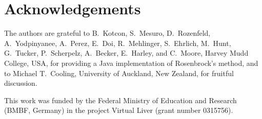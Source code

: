 \documentclass[10pt]{bmc_article}
\newenvironment{bmcformat}{\baselineskip20pt\sloppy\setboolean{publ}{false}}{\baselineskip20pt\sloppy}
\begin{document}
\begin{bmcformat}
    

\section*{Acknowledgements}
The authors are grateful to B.~Kotcon, S.~Mesuro, D.~Rozenfeld, A.~Yodpinyanee,
A.~Perez, E.~Doi, R.~Mehlinger, S.~Ehrlich, M.~Hunt, G.~Tucker, P.~Scherpelz,
A.~Becker, E.~Harley, and C.~Moore, Harvey Mudd College, USA, for providing a
Java implementation of Rosenbrock's method, and to Michael T.~Cooling,
University of Auckland, New Zealand, for fruitful discussion.

This work was funded by the Federal Ministry of Education and Research (BMBF,
Germany) in the project Virtual Liver (grant number 0315756).
 

\newpage
{
   }     %





\end{bmcformat}
\end{document}
